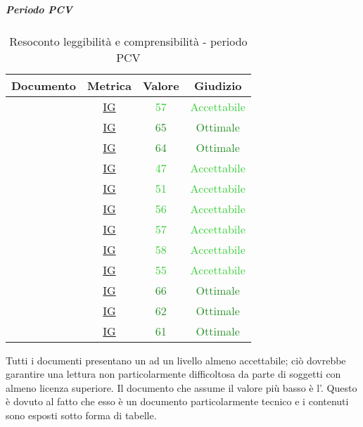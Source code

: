 							\subparagraph{Periodo PCV}
						
						\begin{table}[H]
							\centering
							\small
							\begin{tabular}{c | c | c | c}
								\hline
								\textbf{Documento} & \textbf{Metrica}    & \textbf{Valore} & \textbf{Giudizio} \\ \hline
								\pdpvtre        & \hyperref[MLEC]{IG} & \textcolor{LimeGreen}{57} & \textcolor{LimeGreen}{Accettabile} \\
								\pdqvtre        & \hyperref[MLEC]{IG} & \textcolor{ForestGreen}{65} & \textcolor{ForestGreen}{Ottimale} \\
								\ndpvtre        & \hyperref[MLEC]{IG} & \textcolor{ForestGreen}{64} & \textcolor{ForestGreen}{Ottimale} \\
								\adrvtre        & \hyperref[MLEC]{IG}  & \textcolor{LimeGreen}{47} & \textcolor{LimeGreen}{Accettabile} \\
								\stvdue		& \hyperref[MLEC]{IG}  & \textcolor{LimeGreen}{51} & \textcolor{LimeGreen}{Accettabile} \\
								\glvdue        & \hyperref[MLEC]{IG} & \textcolor{LimeGreen}{56} & \textcolor{LimeGreen}{Accettabile} \\
								\ddpvuno        & \hyperref[MLEC]{IG} & \textcolor{LimeGreen}{57} & \textcolor{LimeGreen}{Accettabile} \\
								\manutvuno        & \hyperref[MLEC]{IG} & \textcolor{LimeGreen}{58} & \textcolor{LimeGreen}{Accettabile} \\
								\manmanvuno        & \hyperref[MLEC]{IG} & \textcolor{LimeGreen}{55} & \textcolor{LimeGreen}{Accettabile} \\
								\vsesettei       & \hyperref[MLEC]{IG}& \textcolor{ForestGreen}{66} & \textcolor{ForestGreen}{Ottimale} \\
								\vottoi       & \hyperref[MLEC]{IG} &  \textcolor{ForestGreen}{62} & \textcolor{ForestGreen}{Ottimale} \\
								\vquattroe       & \hyperref[MLEC]{IG}& \textcolor{ForestGreen}{61} & \textcolor{ForestGreen}{Ottimale} \\
							\end{tabular}
							\caption{Resoconto leggibilità e comprensibilità - periodo PCV}
							\label{tab_resoconto_leggibilità_e_comprensibilità_PPCV}
						\end{table}
					Tutti i documenti presentano un  ad un livello almeno accettabile; ciò dovrebbe garantire una lettura non particolarmente difficoltosa da parte di soggetti con almeno licenza superiore.
					Il documento che assume il valore più basso è l'\adrvtre. Questo è dovuto al fatto che esso è un documento particolarmente tecnico e i contenuti sono esposti sotto forma di tabelle.
						
